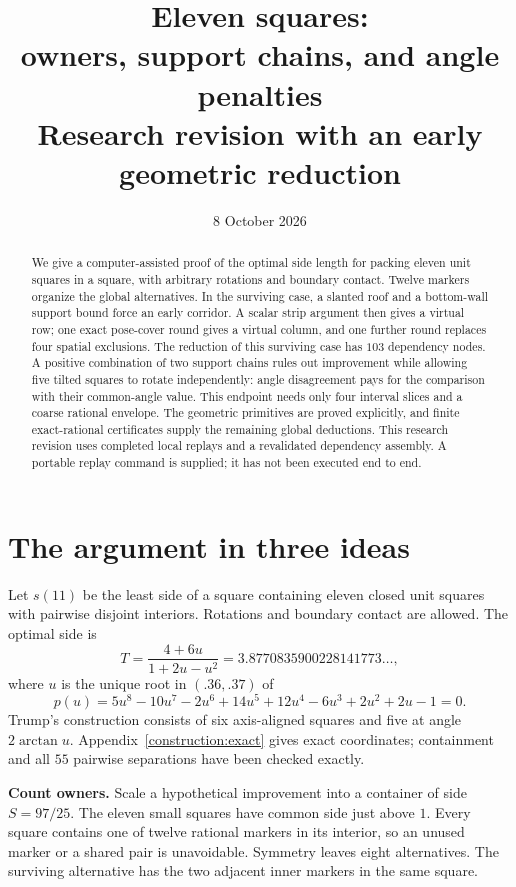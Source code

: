 \documentclass[11pt]{article}
\title{\textcolor{ink}{Eleven squares:\\owners, support chains, and angle penalties}\\[5pt]
\large Research revision with an early geometric reduction}
\author{}
\date{8 October 2026}
\begin{document}
\maketitle
\vspace{-1.5em}
\begin{abstract}
We give a computer-assisted proof of the optimal side length for packing
eleven unit squares in a square, with arbitrary rotations and boundary
contact. Twelve markers organize the global alternatives. In the surviving
case, a slanted roof and a bottom-wall support bound force an early
corridor. A scalar strip argument then gives a virtual row; one exact
pose-cover round gives a virtual column, and one further round replaces
four spatial exclusions. The reduction of this surviving case has $103$
dependency nodes. A positive combination of two support chains rules out improvement
while allowing five tilted squares to rotate independently: angle
disagreement pays for the comparison with their common-angle value.
This endpoint needs only four interval slices and a coarse rational envelope.
The geometric primitives are proved explicitly, and finite exact-rational
certificates supply the remaining global deductions. This research revision
uses completed local replays and a revalidated dependency assembly. A
portable replay command is supplied; it has not been executed end to end.
\end{abstract}

\section{The argument in three ideas}
Let $s(11)$ be the least side of a square containing eleven closed unit
squares with pairwise disjoint interiors. Rotations and boundary contact
are allowed. The optimal side is
\begin{equation}\label{eq:T}
 T=\frac{4+6u}{1+2u-u^2}=3.8770835900228141773\ldots,
\end{equation}
where $u$ is the unique root in $(.36,.37)$ of
\[
 p(u)=5u^8-10u^7-2u^6+14u^5+12u^4-6u^3+2u^2+2u-1=0.
\]
Trump's construction consists of six axis-aligned squares and five at angle
$2\arctan u$. Appendix~\ref{construction:exact} gives exact coordinates;
containment and all $55$ pairwise separations have been checked exactly.

\textbf{Count owners.} Scale a hypothetical improvement into a container
of side $S=97/25$. The eleven small squares have common side just above
$1$. Every square contains one of twelve rational markers in its interior,
so an unused marker or a shared pair is unavoidable. Symmetry leaves
eight alternatives. The surviving alternative has the two adjacent inner
markers in the same square.
\end{document}
